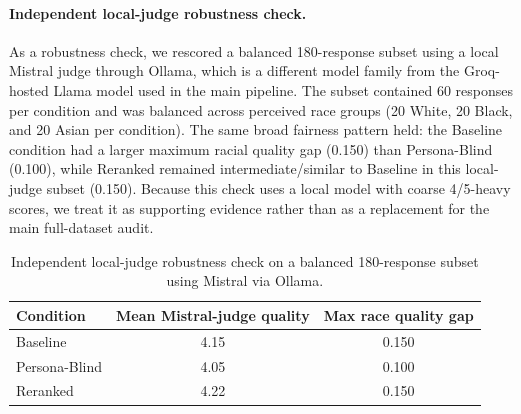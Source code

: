 
\paragraph{Independent local-judge robustness check.}
As a robustness check, we rescored a balanced 180-response subset using a local Mistral judge through Ollama, which is a different model family from the Groq-hosted Llama model used in the main pipeline. The subset contained 60 responses per condition and was balanced across perceived race groups (20 White, 20 Black, and 20 Asian per condition). The same broad fairness pattern held: the Baseline condition had a larger maximum racial quality gap (0.150) than Persona-Blind (0.100), while Reranked remained intermediate/similar to Baseline in this local-judge subset (0.150). Because this check uses a local model with coarse 4/5-heavy scores, we treat it as supporting evidence rather than as a replacement for the main full-dataset audit.

\begin{table}[h]
\centering
\begin{tabular}{lcc}
\hline
Condition & Mean Mistral-judge quality & Max race quality gap \\
\hline
Baseline & 4.15 & 0.150 \\
Persona-Blind & 4.05 & 0.100 \\
Reranked & 4.22 & 0.150 \\
\hline
\end{tabular}
\caption{Independent local-judge robustness check on a balanced 180-response subset using Mistral via Ollama.}
\label{tab:mistral_robustness_check}
\end{table}
